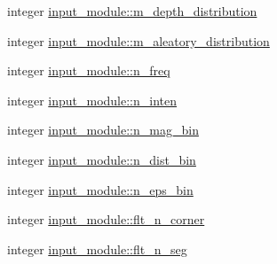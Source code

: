 \begin{DoxyCompactItemize}
\item 
integer \hyperlink{namespaceinput__module_acf6263946873708989398bfd2f91bbef}{input\+\_\+module\+::m\+\_\+depth\+\_\+distribution}
\item 
integer \hyperlink{namespaceinput__module_a39c97f997959a940d039403c89a2b62c}{input\+\_\+module\+::m\+\_\+aleatory\+\_\+distribution}
\item 
integer \hyperlink{namespaceinput__module_a9c4337d8e000b4ec09cd937de3fec1a4}{input\+\_\+module\+::n\+\_\+freq}
\item 
integer \hyperlink{namespaceinput__module_a8e9793e0bad76077bc065ec13bc34910}{input\+\_\+module\+::n\+\_\+inten}
\item 
integer \hyperlink{namespaceinput__module_a16e17c304087bd6dbbca884d691c3c6a}{input\+\_\+module\+::n\+\_\+mag\+\_\+bin}
\item 
integer \hyperlink{namespaceinput__module_ad9cff8fcf1650cc924462f2409ade59d}{input\+\_\+module\+::n\+\_\+dist\+\_\+bin}
\item 
integer \hyperlink{namespaceinput__module_a048d1cd2097b01c570f91e1166300c4d}{input\+\_\+module\+::n\+\_\+eps\+\_\+bin}
\item 
integer \hyperlink{namespaceinput__module_ab43a73209bacb0daeff92dd8758952b6}{input\+\_\+module\+::flt\+\_\+n\+\_\+corner}
\item 
integer \hyperlink{namespaceinput__module_ab8cf9e7e4661e076527f292296cca198}{input\+\_\+module\+::flt\+\_\+n\+\_\+seg}
\end{DoxyCompactItemize}

